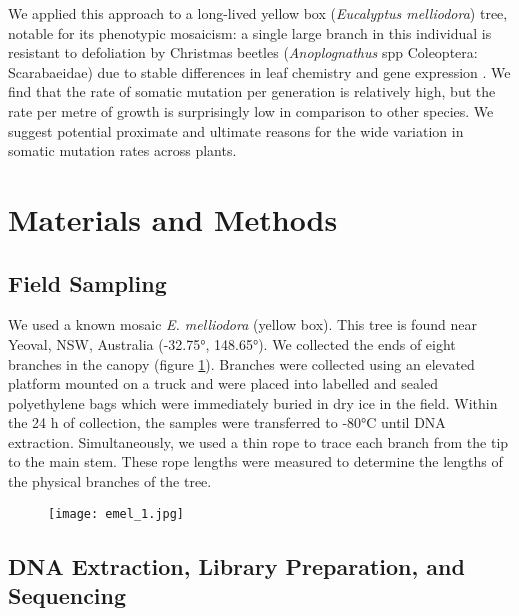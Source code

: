We applied this approach to a long-lived yellow box (\textit{Eucalyptus melliodora}) tree, notable for its phenotypic mosaicism: a single large branch in this individual is resistant to defoliation by Christmas beetles (\textit{Anoplognathus} spp Coleoptera: Scarabaeidae) due to stable differences in leaf chemistry and gene expression \parencite{padovan_differences_2013, edwards_mosaic_1990}. We find that the rate of somatic mutation per generation is relatively high, but the rate per metre of growth is surprisingly low in comparison to other species. We suggest potential proximate and ultimate reasons for the wide variation in somatic mutation rates across plants.


\section{Materials and Methods}

\subsection{Field Sampling}

We used a known mosaic \textit{E. melliodora} (yellow box). This tree is found near Yeoval, NSW, Australia (-32.75°, 148.65°). We collected the ends of eight branches in the canopy (figure \ref{fig:emel_1}). Branches were collected using an elevated platform mounted on a truck and were placed into labelled and sealed polyethylene bags which were immediately buried in dry ice in the field. Within the 24 h of collection, the samples were transferred to -80°C until DNA extraction. Simultaneously, we used a thin rope to trace each branch from the tip to the main stem. These rope lengths were measured to determine the lengths of the physical branches of the tree. 

\begin{figure}
\texttt{[image: emel\_1.jpg]}
\label{fig:emel_1}
\end{figure}

\subsection{DNA Extraction, Library Preparation, and Sequencing}

